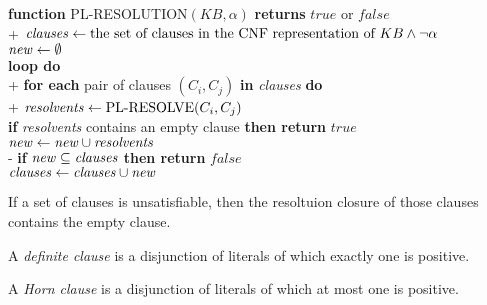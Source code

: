 \documentclass{article}
\begin{document}
\begin{pseudo}
    \textbf{function} PL-RESOLUTION$(KB,\alpha)$ \textbf{returns} $true$ or $false$\\+
        $\text{\emph{clauses}}\leftarrow \text{the set of clauses in the CNF representation of }KB\wedge\neg\alpha$\\
        $\text{\emph{new}}\leftarrow\emptyset$\\
        \textbf{loop do}\\+
            \textbf{for each} pair of clauses $(C_i,C_j)$ \textbf{in} \emph{clauses} \textbf{do}\\+
                $\text{\emph{resolvents}}\leftarrow\text{PL-RESOLVE}(C_i,C_j)$\\
                \textbf{if} \emph{resolvents} contains an empty clause \textbf{then return} $true$\\
                $\text{\emph{new}}\leftarrow \text{\emph{new}}\cup \text{\emph{resolvents}}$\\-
            \textbf{if} $\text{\emph{new}} \subseteq \text{\emph{clauses}}$ \textbf{then return} $false$\\
            $\text{\emph{clauses}}\leftarrow\text{\emph{clauses}}\cup\text{\emph{new}}$
\end{pseudo}

\begin{theorem}
    If a set of clauses is unsatisfiable, then the resoltuion closure of
    those clauses contains the empty clause. 
\end{theorem}

\begin{definition}
    A \emph{definite clause} is a disjunction of literals of which
    exactly one is positive.
\end{definition}

\begin{definition}
    A \emph{Horn clause} is a disjunction of literals of which at most
    one is positive.
\end{definition}
\end{document}
